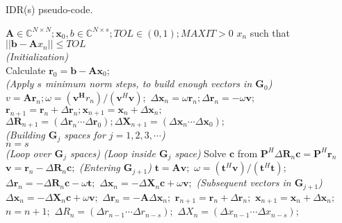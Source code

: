\documentclass[12pt]{article}
\begin{document}
\begin{algorithm}
  \caption{IDR(s) pseudo-code.}
  \label{alg:idr}
  \begin{algorithmic}[1]
	  \Require $\textbf{A} \in \mathbb{C}^{N \times N}; \mathbf{x}_0, b \in \mathbb{C}^{N \times s}; TOL \in (0,1); MAXIT > 0$
	  \Ensure $x_n$ such that $||\mathbf{b}-\mathbf{A}x_n|| \leq TOL$\\
	  \emph{(Initialization)}\\
	  Calculate $\mathbf{r}_0=\mathbf{b}-\mathbf{Ax}_0$;\\
	  \emph{(Apply $s$ minimum norm steps, to build enough vectors in $\mathbf{G}_0$)}
	  	\State $v=\mathbf{Ar}_n; \omega=(\mathbf{v}^\mathbf{H}r_n)/(\mathbf{v}^H\mathbf{v});$
		\State $\Delta \mathbf{x}_n = \omega \mathbf{r}_n; \Delta \mathbf{r}_n = - \omega \mathbf{v}; $
		\State $\mathbf{r}_{n+1} = \mathbf{r}_n + \Delta \mathbf{r}_n; \mathbf{x}_{n+1}= \mathbf{x}_{n} + \Delta \mathbf{x}_n; $ 
	  \EndFor
	  \State $\Delta \mathbf{R}_{n+1}= (\Delta \mathbf{r}_n \cdots \Delta \mathbf{r}_0); \Delta \mathbf{X}_{n+1}= (\Delta \mathbf{x}_n \cdots \Delta \mathbf{x}_0);$\\
	  \emph{(Building $\mathbf{G}_j$ spaces for $j=1,2,3,\cdots$)}\\
	  $n=s$\\
	  \emph{(Loop over $\mathbf{G}_j$ spaces)}
	  	\State \emph{(Loop inside $\mathbf{G}_j$ space)}
		\State Solve $\mathbf{c}$ from $\mathbf{P}^H \Delta \mathbf{R}_n \mathbf{c} = \mathbf{P}^H \mathbf{r}_n$
		\State $\mathbf{v}=\mathbf{r}_n-\Delta \mathbf{R}_n \mathbf{c};$
			\State \emph{(Entering $\mathbf{G}_{j+1}$)}
			\State $\mathbf{t}=\mathbf{Av};$
			\State $\omega = (\mathbf{t}^H\mathbf{v})/(\mathbf{t}^H\mathbf{t});$
			\State $\Delta \mathbf{r}_n = - \Delta \mathbf{R}_n \mathbf{c} - \omega \mathbf{t};$
			\State $\Delta \mathbf{x}_n = - \Delta \mathbf{X}_n \mathbf{c} + \omega \mathbf{v};$
		\Else
			\State \emph{(Subsequent vectors in $\mathbf{G}_{j+1}$)}
			\State $\Delta \mathbf{x}_n = - \Delta \mathbf{X}_n \mathbf{c} + \omega \mathbf{v};$
			\State $\Delta \mathbf{r}_n = -\mathbf{A} \Delta \mathbf{x}_n ;$
		\EndIf
		\State $\mathbf{r}_{n+1} = \mathbf{r}_n + \Delta \mathbf{r}_n;$
		\State $\mathbf{x}_{n+1} = \mathbf{x}_n + \Delta \mathbf{x}_n;$
		\State $n=n+1;$
		\State $\Delta R_n = (\Delta r_{n-1} \cdots \Delta r_{n-s});$
		\State $\Delta X_n = (\Delta x_{n-1} \cdots \Delta x_{n-s});$
		\EndFor
	  \EndWhile
  \end{algorithmic}
\end{algorithm}
	  
\end{document}
